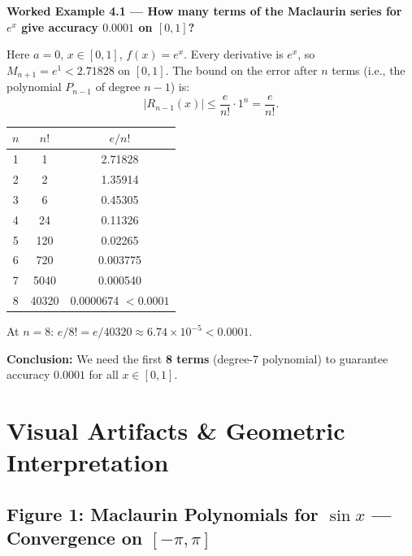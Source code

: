 \documentclass[12pt,a4paper]{article}
\begin{document}
\textbf{Worked Example 4.1 --- How many terms of the Maclaurin series for \(e^x\) give accuracy
\(0.0001\) on \([0,1]\)?}

Here \(a = 0\), \(x \in [0,1]\), \(f(x) = e^x\).
Every derivative is \(e^x\), so \(M_{n+1} = e^1 < 2.71828\) on \([0,1]\).
The bound on the error after \(n\) terms (i.e., the polynomial \(P_{n-1}\) of degree \(n-1\)) is:
\[
  |R_{n-1}(x)| \leq \frac{e}{n!} \cdot 1^n = \frac{e}{n!}.
\]

\begin{center}
\begin{tabular}{ccc}
\toprule
\(n\) & \(n!\) & \(e / n!\) \\
\midrule
1 & 1 & 2.71828 \\
2 & 2 & 1.35914 \\
3 & 6 & 0.45305 \\
4 & 24 & 0.11326 \\
5 & 120 & 0.02265 \\
6 & 720 & 0.003775 \\
7 & 5040 & 0.000540 \\
8 & 40320 & 0.0000674 $< 0.0001$ \\
\bottomrule
\end{tabular}
\end{center}

At \(n = 8\): \(e/8! = e/40320 \approx 6.74 \times 10^{-5} < 0.0001\).

\textbf{Conclusion:} We need the first \textbf{8 terms} (degree-7 polynomial) to guarantee
accuracy \(0.0001\) for all \(x \in [0,1]\).

\section{Visual Artifacts \& Geometric Interpretation}

\subsection*{Figure 1: Maclaurin Polynomials for \(\sin x\) --- Convergence on \([-\pi, \pi]\)}

\begin{center}
\end{center}
\end{document}
